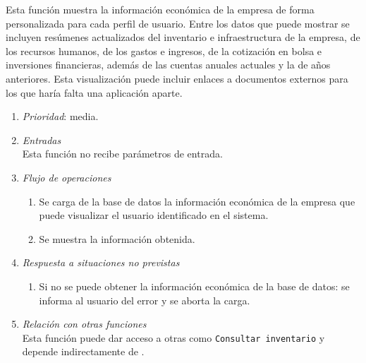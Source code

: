 

	Esta función muestra la información económica de la empresa de forma personalizada para cada perfil de usuario. Entre los datos que puede mostrar se incluyen resúmenes actualizados del inventario e infraestructura de la empresa, de los recursos humanos, de los gastos e ingresos, de la cotización en bolsa e inversiones financieras, además de las cuentas anuales actuales y la de años anteriores. Esta visualización puede incluir enlaces a documentos externos para los que haría falta una aplicación aparte.

	\begin{enumerate}
		\item \textit{Prioridad}: media.
		\item \textit{Entradas}\\
			Esta función no recibe parámetros de entrada.
			\item \textit{Flujo de operaciones}
				\begin{enumerate}
					\item Se carga de la base de datos la información económica de la empresa que puede visualizar el usuario identificado en el sistema.
					\item Se muestra la información obtenida.
			\end{enumerate}
		\item \textit{Respuesta a situaciones no previstas}
			\begin{enumerate}
				\item Si no se puede obtener la información económica de la base de datos: se informa al usuario del error y se aborta la carga.
			\end{enumerate}
		\item \textit{Relación con otras funciones}\\
			Esta función puede dar acceso a otras como \verb|Consultar inventario| y depende indirectamente de .
	\end{enumerate}
